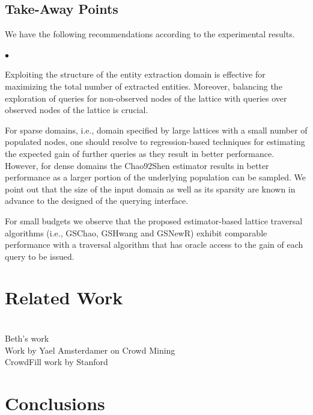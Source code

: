 \documentclass{vldb}
\newcommand{\squishlist}{
   \begin{list}{$\bullet$}
    {
      \setlength{\itemsep}{0pt}
      \setlength{\parsep}{3pt}
      \setlength{\topsep}{3pt}
      \setlength{\partopsep}{0pt}
      \setlength{\leftmargin}{1.5em}
      \setlength{\labelwidth}{1em}
      \setlength{\labelsep}{0.5em} } }
\newcommand{\squishend}{
    \end{list}  }
\begin{document}
\subsection{Take-Away Points}
We have the following recommendations according to the experimental results.
\squishlist
\item Exploiting the structure of the entity extraction domain is effective for maximizing the total number of extracted entities. Moreover, balancing the exploration of queries for non-observed nodes of the lattice with queries over observed nodes of the lattice is crucial.
\item For sparse domains, i.e., domain specified by large lattices with a small number of populated nodes, one should resolve to regression-based techniques for estimating the expected gain of further queries as they result in better performance. However, for dense domains the Chao92Shen estimator results in better performance as a larger portion of the underlying population can be sampled. We point out that the size of the input domain as well as its sparsity are known in advance to the designed of the querying interface. 
\item For small budgets we observe that the proposed estimator-based lattice traversal algorithms (i.e., GSChao, GSHwang and GSNewR) exhibit comparable performance with a traversal algorithm that has oracle access to the gain of each query to be issued.
\squishend

\vspace{2pt}\section{Related Work}
\label{sec:related}

\ \\Beth's work
\ \\Work by Yael Amsterdamer on Crowd Mining
\ \\CrowdFill work by Stanford

\section{Conclusions}
\label{sec:conclusions}




\end{document}
